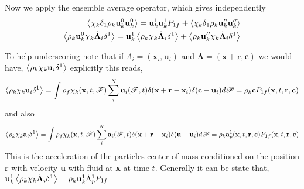 Now we apply the ensemble average operator, which gives independently 
\begin{align}
    \left<\chi_k\delta_1 \rho_k \textbf{u}_k^0 \textbf{u}_k^0\right>
    = 
    \textbf{u}_k^1 \textbf{u}_k^1 P_{1f}
    + \left<\chi_k\delta_1 \rho_k \textbf{u}_k'' \textbf{u}_k''\right>\\
    \left<\rho_k \textbf{u}_k^0 \chi_k \dot{\bm\Lambda}_i \delta^1\right>
    = 
    \textbf{u}_k^1 \left<\rho_k  \chi_k \dot{\bm\Lambda}_i \delta^1\right>
    + \left<\rho_k \textbf{u}_k'' \chi_k \dot{\bm\Lambda}_i \delta^1\right>
\end{align}

To help underscoring note that if $\Lambda_i = (\textbf{x}_i,\textbf{u}_i)$ and $\bm\Lambda = (\textbf{x}+\textbf{r},\textbf{c})$ we would have, $\left<\rho_k  \chi_k \textbf{u}_i \delta^1\right>$ explicitly this reads, 
\begin{equation}
    \left<\rho_k  \chi_k \textbf{u}_i \delta^1\right>
    = \int 
    \rho_f \chi_k(\textbf{x},t,\mathscr{F})
    \sum_i^N \textbf{u}_i(\mathscr{F},t) 
    \delta(\textbf{x}+\textbf{r}-\textbf{x}_i)
    \delta(\textbf{c}-\textbf{u}_i)
    d\mathscr{P}
    = 
    \rho_k \textbf{c}
    P_{1f}(\textbf{x},t,\textbf{r},\textbf{c})
\end{equation}
and also 
\begin{equation}
    \left<\rho_k  \chi_k \textbf{a}_i \delta^1\right>
    = \int 
    \rho_f \chi_k(\textbf{x},t,\mathscr{F})
    \sum_i^N \textbf{a}_i(\mathscr{F},t) 
    \delta(\textbf{x}+\textbf{r}-\textbf{x}_i)
    \delta(\textbf{u}-\textbf{u}_i)
    d\mathscr{P}
    = 
    \rho_k \textbf{a}_p^1(\textbf{x},t,\textbf{r},\textbf{c})
    P_{1f}(\textbf{x},t,\textbf{r},\textbf{c})
\end{equation}
This is the acceleration of the particles center of mass conditioned on the position \textbf{r} with velocity \textbf{u} with fluid at \textbf{x} at time $t$. 
Generally it can be state that, $\textbf{u}_k^1 \left<\rho_k  \chi_k \dot{\bm\Lambda}_i \delta^1\right> = \rho_k \textbf{u}_k^1 \dot{\Lambda}_p^1 P_{1f}$

